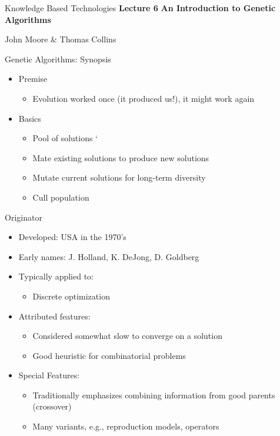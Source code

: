 \documentclass[%
pdf,
colorBG,
slideColor,
tcrico,
]{prosper}
\begin{document}
\begin{slide}{Knowledge Based Technologies}
	\textbf{Lecture 6} 
	\newline
	\textbf{An Introduction to Genetic Algorithms}

	\small
	John Moore \& Thomas Collins
\end{slide}


\begin{slide}{Genetic Algorithms: Synopsis}
	\begin{itemize}
	\item Premise
		\begin{itemize}
		\item Evolution worked once (it produced us!), it might work again
		\end{itemize}
	\item Basics
		\begin{itemize}
		\item Pool of solutions
	`	\item  Mate existing solutions to produce new solutions
		\item Mutate current solutions for long-term diversity
		\item Cull population
		\end{itemize}
	\end{itemize}
\end{slide}


\begin{slide}{Originator}
\tiny
\begin{itemize}
\item Developed: USA in the 1970's
\item Early names: J. Holland, K. DeJong, D. Goldberg
\item Typically applied to:
\begin{itemize}
\item Discrete optimization
\end{itemize}
\item Attributed features:
\begin{itemize}
\item Considered somewhat slow to converge on a solution
\item Good heuristic for combinatorial problems
\end{itemize}
\item Special Features:
\begin{itemize}
\item Traditionally emphasizes combining information from good parents (crossover)
\item Many variants, e.g., reproduction models, operators
\end{itemize}
\end{itemize}
\end{slide}
\end{document}
